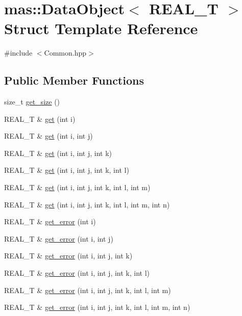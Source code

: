 \hypertarget{structmas_1_1_data_object}{\section{mas\-:\-:Data\-Object$<$ R\-E\-A\-L\-\_\-\-T $>$ Struct Template Reference}
\label{structmas_1_1_data_object}
}


{\ttfamily \#include $<$Common.\-hpp$>$}

\subsection*{Public Member Functions}
\begin{DoxyCompactItemize}
\item 
size\-\_\-t \hyperlink{structmas_1_1_data_object_add2f5e6a1dd101fb5b970a80a3cc539c}{get\-\_\-size} ()
\item 
R\-E\-A\-L\-\_\-\-T \& \hyperlink{structmas_1_1_data_object_ab75fa55e21c8dff0dccbc0db5f736a45}{get} (int i)
\item 
R\-E\-A\-L\-\_\-\-T \& \hyperlink{structmas_1_1_data_object_a99f5ea23dc40ff5bac4b37eab38a5353}{get} (int i, int j)
\item 
R\-E\-A\-L\-\_\-\-T \& \hyperlink{structmas_1_1_data_object_ad90d43d9bd0d663675f09fce75045232}{get} (int i, int j, int k)
\item 
R\-E\-A\-L\-\_\-\-T \& \hyperlink{structmas_1_1_data_object_a167ac06a0911247fec75855a04dcc020}{get} (int i, int j, int k, int l)
\item 
R\-E\-A\-L\-\_\-\-T \& \hyperlink{structmas_1_1_data_object_a3c5e49fb656a85a37d25aaffe8f3f1db}{get} (int i, int j, int k, int l, int m)
\item 
R\-E\-A\-L\-\_\-\-T \& \hyperlink{structmas_1_1_data_object_a005d119a6238683e259e1c8a9eade1f7}{get} (int i, int j, int k, int l, int m, int n)
\item 
R\-E\-A\-L\-\_\-\-T \& \hyperlink{structmas_1_1_data_object_a71808336487899af5c16fedebbdd32c0}{get\-\_\-error} (int i)
\item 
R\-E\-A\-L\-\_\-\-T \& \hyperlink{structmas_1_1_data_object_ad19317a28681164636741be652262c48}{get\-\_\-error} (int i, int j)
\item 
R\-E\-A\-L\-\_\-\-T \& \hyperlink{structmas_1_1_data_object_a89ed630b477a3a54caf61c9004d37ed9}{get\-\_\-error} (int i, int j, int k)
\item 
R\-E\-A\-L\-\_\-\-T \& \hyperlink{structmas_1_1_data_object_a1682f9c442a8254cd4083822b654d92d}{get\-\_\-error} (int i, int j, int k, int l)
\item 
R\-E\-A\-L\-\_\-\-T \& \hyperlink{structmas_1_1_data_object_a74530ddb39b14d7b2510da8d9f53701e}{get\-\_\-error} (int i, int j, int k, int l, int m)
\item 
R\-E\-A\-L\-\_\-\-T \& \hyperlink{structmas_1_1_data_object_ac58995528d64677e1434d4e47a7a13c3}{get\-\_\-error} (int i, int j, int k, int l, int m, int n)
\end{DoxyCompactItemize}
